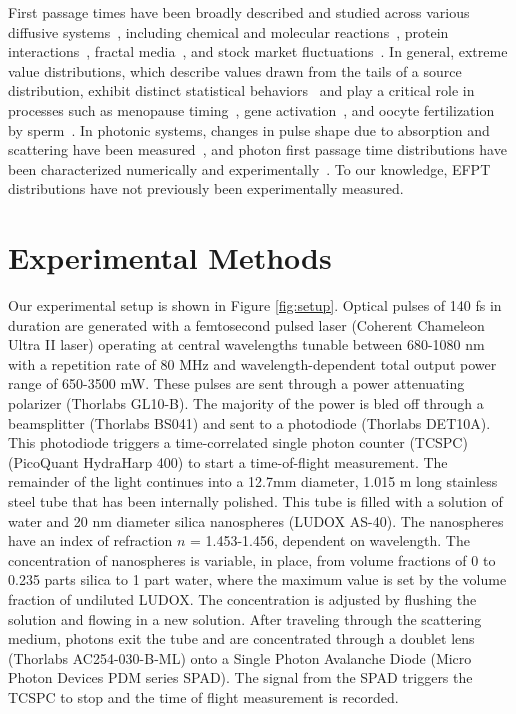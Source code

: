 First passage times have been broadly described and studied across various diffusive systems~\cite{redner_guide_2001,weiss_applications_2002,godec_first_2016,noskowicz_average_1988}, including chemical and molecular reactions~\cite{redner_guide_2001,grebenkov_molecular_2021}, protein interactions~\cite{polizzi_mean_2016}, fractal media~\cite{chun_heterogeneous_2023}, and stock market fluctuations~\cite{barney_first-passage-time_2017,zsurkis_first_2024}. In general, extreme value distributions, which describe values drawn from the tails of a source distribution, exhibit distinct statistical behaviors~\cite{lawley_distribution_2020,lawley_universal_2020} and play a critical role in processes such as menopause timing~\cite{lawley_slowest_2023}, gene activation~\cite{schuss_redundancy_2019}, and oocyte fertilization by sperm~\cite{meerson_mortality_2015,schuss_redundancy_2019}.  In photonic systems, changes in pulse shape due to absorption and scattering have been measured~\cite{lee_using_2007,madsen_experimental_1992,ishimaru_diffusion_1978,yoo_time-resolved_1990,yoo_when_1990,zhang_wave_2002,calba_ultrashort_2008}, and photon first passage time distributions have been characterized numerically and experimentally~\cite{rossetto_isotropic_2022,long_particle_2001,weiss_applications_2002,zeller_light_2020}. To our knowledge, EFPT distributions have not previously been experimentally measured.

\section{Experimental Methods}\label{sec:exp_meth}
Our experimental setup is shown in Figure \ref{fig:setup}. Optical pulses of 140 fs in duration are generated with a femtosecond pulsed laser (Coherent Chameleon Ultra II laser) operating at central wavelengths tunable between 680-1080 nm with a repetition rate of 80 MHz and wavelength-dependent total output power range of 650-3500 mW. These pulses are sent through a power attenuating polarizer (Thorlabs GL10-B).  The majority of the power is bled off through a beamsplitter (Thorlabs BS041) and sent to a photodiode (Thorlabs DET10A).  This photodiode triggers a time-correlated single photon counter (TCSPC) (PicoQuant HydraHarp 400) to start a time-of-flight measurement.  The remainder of the light continues into a 12.7mm diameter, 1.015 m long stainless steel tube that has been internally polished.  This tube is filled with a solution of water and 20 nm diameter silica nanospheres (LUDOX AS-40). The nanospheres have an index of refraction $n$ = 1.453-1.456, dependent on wavelength.  The concentration of nanospheres is variable, in place, from volume fractions of 0 to 0.235 parts silica to 1 part water, where the maximum value is set by the volume fraction of undiluted LUDOX. The  concentration is adjusted by flushing the solution and flowing in a new solution.  After traveling through the scattering medium, photons exit the tube and are concentrated through a doublet lens (Thorlabs AC254-030-B-ML) onto a Single Photon Avalanche Diode (Micro Photon Devices PDM series SPAD).  The signal from the SPAD triggers the TCSPC to stop and the time of flight measurement is recorded. 

